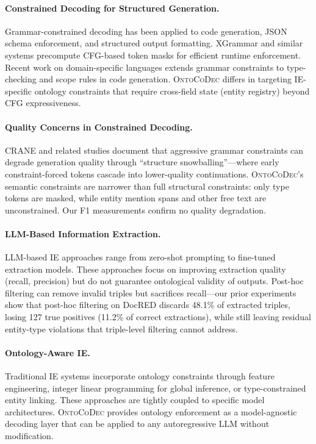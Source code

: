 \documentclass[11pt,a4paper]{article}
\newcommand{\sys}{\textsc{OntoCoDec}}
\begin{document}
\paragraph{Constrained Decoding for Structured Generation.}
Grammar-constrained decoding has been applied to code generation, JSON schema enforcement, and structured output formatting. XGrammar and similar systems precompute CFG-based token masks for efficient runtime enforcement. Recent work on domain-specific languages extends grammar constraints to type-checking and scope rules in code generation. \sys{} differs in targeting IE-specific ontology constraints that require cross-field state (entity registry) beyond CFG expressiveness.

\paragraph{Quality Concerns in Constrained Decoding.}
CRANE and related studies document that aggressive grammar constraints can degrade generation quality through ``structure snowballing''---where early constraint-forced tokens cascade into lower-quality continuations. \sys{}'s semantic constraints are narrower than full structural constraints: only type tokens are masked, while entity mention spans and other free text are unconstrained. Our F1 measurements confirm no quality degradation.

\paragraph{LLM-Based Information Extraction.}
LLM-based IE approaches range from zero-shot prompting to fine-tuned extraction models. These approaches focus on improving extraction quality (recall, precision) but do not guarantee ontological validity of outputs. Post-hoc filtering can remove invalid triples but sacrifices recall---our prior experiments show that post-hoc filtering on DocRED discards 48.1\% of extracted triples, losing 127 true positives (11.2\% of correct extractions), while still leaving residual entity-type violations that triple-level filtering cannot address.

\paragraph{Ontology-Aware IE.}
Traditional IE systems incorporate ontology constraints through feature engineering, integer linear programming for global inference, or type-constrained entity linking. These approaches are tightly coupled to specific model architectures. \sys{} provides ontology enforcement as a model-agnostic decoding layer that can be applied to any autoregressive LLM without modification.
\end{document}
